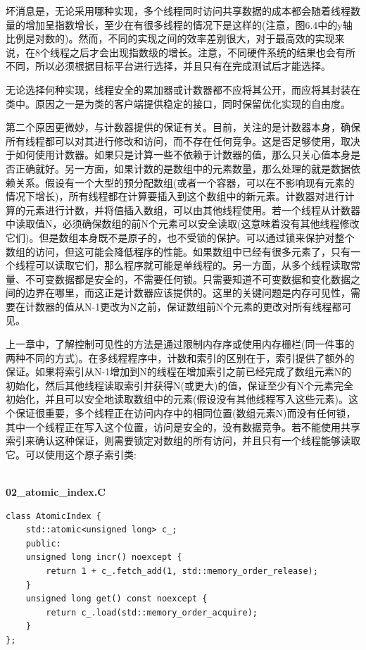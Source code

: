 坏消息是，无论采用哪种实现，多个线程同时访问共享数据的成本都会随着线程数量的增加呈指数增长，至少在有很多线程的情况下是这样的(注意，图6.4中的y轴比例是对数的)。然而，不同的实现之间的效率差别很大，对于最高效的实现来说，在8个线程之后才会出现指数级的增长。注意，不同硬件系统的结果也会有所不同，所以必须根据目标平台进行选择，并且只有在完成测试后才能选择。

无论选择何种实现，线程安全的累加器或计数器都不应将其公开，而应将其封装在类中。原因之一是为类的客户端提供稳定的接口，同时保留优化实现的自由度。

第二个原因更微妙，与计数器提供的保证有关。目前，关注的是计数器本身，确保所有线程都可以对其进行修改和访问，而不存在任何竞争。这是否足够使用，取决于如何使用计数器。如果只是计算一些不依赖于计数器的值，那么只关心值本身是否正确就好。另一方面，如果计数的是数组中的元素数量，那么处理的就是数据依赖关系。假设有一个大型的预分配数组(或者一个容器，可以在不影响现有元素的情况下增长)，所有线程都在计算要插入到这个数组中的新元素。计数器对进行计算的元素进行计数，并将值插入数组，可以由其他线程使用。若一个线程从计数器中读取值N，必须确保数组的前N个元素可以安全读取(这意味着没有其他线程修改它们)。但是数组本身既不是原子的，也不受锁的保护。可以通过锁来保护对整个数组的访问，但这可能会降低程序的性能。如果数组中已经有很多元素了，只有一个线程可以读取它们，那么程序就可能是单线程的。另一方面，从多个线程读取常量、不可变数据都是安全的，不需要任何锁。只需要知道不可变数据和变化数据之间的边界在哪里，而这正是计数器应该提供的。这里的关键问题是内存可见性，需要在计数器的值从N-1更改为N之前，保证数组前N个元素的更改对所有线程都可见。

上一章中，了解控制可见性的方法是通过限制内存序或使用内存栅栏(同一件事的两种不同的方式)。在多线程程序中，计数和索引的区别在于，索引提供了额外的保证。如果将索引从N-1增加到N的线程在增加索引之前已经完成了数组元素N的初始化，然后其他线程读取索引并获得N(或更大)的值，保证至少有N个元素完全初始化，并且可以安全地读取数组中的元素(假设没有其他线程写入这些元素)。这个保证很重要，多个线程正在访问内存中的相同位置(数组元素N)而没有任何锁，其中一个线程正在写入这个位置，访问是安全的，没有数据竞争。若不能使用共享索引来确认这种保证，则需要锁定对数组的所有访问，并且只有一个线程能够读取它。可以使用这个原子索引类:

\hspace*{\fill} \\ %
\noindent
\textbf{02\_atomic\_index.C}
\begin{lstlisting}[style=styleCXX]
class AtomicIndex {
	std::atomic<unsigned long> c_;
	public:
	unsigned long incr() noexcept {
		return 1 + c_.fetch_add(1, std::memory_order_release);
	}
	unsigned long get() const noexcept {
		return c_.load(std::memory_order_acquire);
	}
};
\end{lstlisting}

